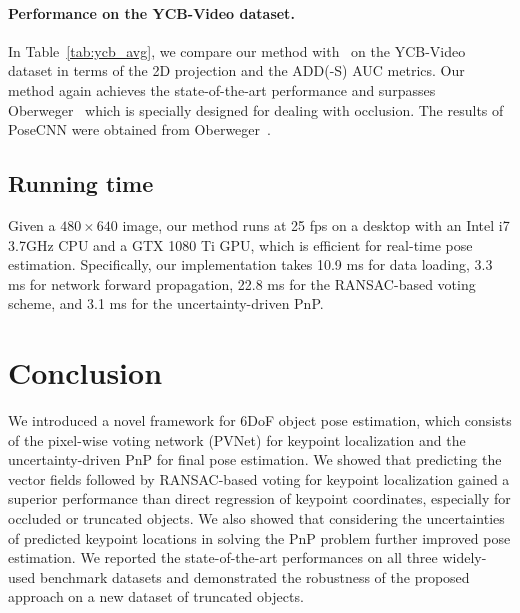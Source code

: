 \documentclass[10pt,twocolumn,letterpaper]{article}
\begin{document}
\paragraph{Performance on the YCB-Video dataset.} In Table~\ref{tab:ycb_avg}, we compare our method with~\cite{ xiang2017posecnn, oberweger2018making} on the YCB-Video dataset in terms of the 2D projection and the ADD(-S) AUC metrics. Our method again achieves the state-of-the-art performance and surpasses Oberweger~\cite{oberweger2018making} which is specially designed for dealing with occlusion. The results of PoseCNN were obtained from Oberweger~\cite{oberweger2018making}.

\begin{table}
\begin{center}
\end{center}
\vspace{-0.2mm}
\caption{The accuracies of our method and the baseline methods on the YCB-Video dataset in terms of the \textbf{2D projection} and the \textbf{ADD(-S) AUC} metrics.}
\label{tab:ycb_avg}
\vspace{-2mm}
\end{table}\subsection{Running time}

Given a $480 \times 640$ image, our method runs at 25 fps on a desktop with an Intel i7 3.7GHz CPU and a GTX 1080 Ti GPU, which is efficient for real-time pose estimation. Specifically, our implementation takes 10.9 ms for data loading, 3.3 ms for network forward propagation, 22.8 ms for the RANSAC-based voting scheme, and 3.1 ms for the uncertainty-driven PnP.

\section{Conclusion}

We introduced a novel framework for 6DoF object pose estimation, which consists of the pixel-wise voting network (PVNet) for keypoint localization and the uncertainty-driven PnP for final pose estimation. We showed that predicting the vector fields followed by RANSAC-based voting for keypoint localization gained a superior performance than direct regression of keypoint coordinates, especially for occluded or truncated objects. We also showed that considering the uncertainties of predicted keypoint locations in solving the PnP problem further improved pose estimation. We reported the state-of-the-art performances on all three widely-used benchmark datasets and demonstrated the robustness of the proposed approach on a new dataset of truncated objects. 


{\small


}
\end{document}
